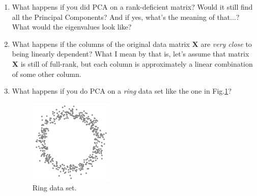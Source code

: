 \documentclass[10pt,twocolumn]{article}
\begin{document}
\begin{enumerate}
\item What happens if you did PCA on a rank-deficient matrix? Would it still find all the Principal Components? And if yes, what's the meaning of that...? What would the eigenvalues look like?
\item What happens if the columns of the original data matrix $\bm{X}$ are \textit{very close} to being linearly dependent? What I mean by that is, let's assume that matrix $\bm{X}$ is still of full-rank, but each column is approximately a linear combination of some other column.
\item What happens if you do PCA on a \textit{ring} data set like the one in Fig.\ref{fig:ring-data-set}?
\begin{figure}[H]
\centering\includegraphics[width=4cm]{ring-data-set.png}
\caption{Ring data set.}
\label{fig:ring-data-set}
\end{figure}
\end{enumerate}








\thebibliography{}
\end{document}

